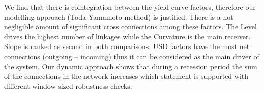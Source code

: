 \documentclass[12pt,bibliography=totoc]{article}
\begin{document}
We find that there is cointegration between the yield curve factors, therefore our modelling approach (Toda-Yamamoto method) is justified. There is a not negligible amount of significant cross connections among these factors. The Level drives the highest number of linkages while the Curvature is the main receiver. Slope is ranked as second in both comparisons. USD factors have the most net connections (outgoing – incoming) thus it can be considered as the main driver of the system. Our dynamic approach shows that during a recession period the sum of the connections in the network increases which statement is supported with different window sized robustness checks.



\end{document}
